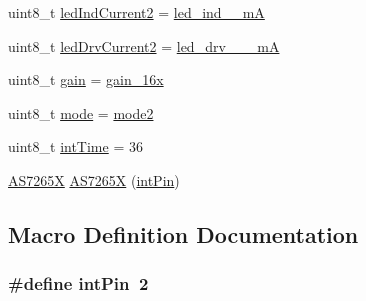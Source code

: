 \begin{DoxyCompactItemize}
\item 
uint8\-\_\-t \hyperlink{Due__AS7265X__Spectrometer_8ino_a17131bcd1c9c7fcbb7e4f75fa9bd2954}{led\-Ind\-Current2} = \hyperlink{AS7265X_8h_a67dbe46dbd778ab6f85e0506a2a5121b}{led\-\_\-ind\-\_\-\_\-m\-A}
\item 
uint8\-\_\-t \hyperlink{Due__AS7265X__Spectrometer_8ino_a41b9ee02dc5d7724745208f981b0c145}{led\-Drv\-Current2} = \hyperlink{AS7265X_8h_a56ef4b37340d832f0785fbcee8f9075e}{led\-\_\-drv\-\_\-\_\-\_\-m\-A}
\item 
uint8\-\_\-t \hyperlink{Due__AS7265X__Spectrometer_8ino_a5c9c0f59d06b7360c990c3f49be81fa7}{gain} = \hyperlink{AS7265X_8h_a97c3f3fc2af52d4211d96e9649aedd06}{gain\-\_\-16x}
\item 
uint8\-\_\-t \hyperlink{Due__AS7265X__Spectrometer_8ino_a37e90f5e3bd99fac2021fb3a326607d4}{mode} = \hyperlink{AS7265X_8h_a63231276e0fcd8150890da1546a9eb92}{mode2}
\item 
uint8\-\_\-t \hyperlink{Due__AS7265X__Spectrometer_8ino_a91f2d101a2ec3dda9ff42c39d3913a90}{int\-Time} = 36
\item 
\hyperlink{classAS7265X}{A\-S7265\-X} \hyperlink{Due__AS7265X__Spectrometer_8ino_aab7193fb37bf8400c656a3db9f2c6427}{A\-S7265\-X} (\hyperlink{Due__AS7265X__Spectrometer_8ino_a7a47c5b8a7e1c151db910d1c2518b08d}{int\-Pin})
\end{DoxyCompactItemize}


\subsection{Macro Definition Documentation}
\hypertarget{Due__AS7265X__Spectrometer_8ino_a7a47c5b8a7e1c151db910d1c2518b08d}{
\subsubsection[{int\-Pin}]{\setlength{\rightskip}{0pt plus 5cm}\#define int\-Pin~2}}\label{Due__AS7265X__Spectrometer_8ino_a7a47c5b8a7e1c151db910d1c2518b08d}


